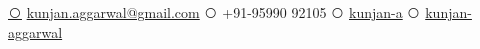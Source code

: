 \documentclass[letterpaper]{style} %
\def\ci#1{\textcircled{\resizebox{.5em}{!}{#1}}}
\begin{document}

{
\href{mailto:kunjan.aggarwal@gmail.com}{\ci{\faEnvelope}} {\fontsize{10}{10}\selectfont \href{mailto:kunjan.aggarwal@gmail.com}{kunjan.aggarwal@gmail.com}}}
{
\ci{\faPhone}  {\fontsize{10}{10}\selectfont +91-95990 92105} 
}
{
\href{https://github.com/kunjan-a}{\ci{\faGithub}} {\fontsize{10}{10}\selectfont \href{https://github.com/kunjan-a}{kunjan-a}}
}
{
\href{https://www.linkedin.com/in/kunjan-aggarwal}{\ci{\faLinkedin}} {\fontsize{10}{10}\selectfont \href{https://www.linkedin.com/in/kunjan-aggarwal}{kunjan-aggarwal}}
}




\end{document}
